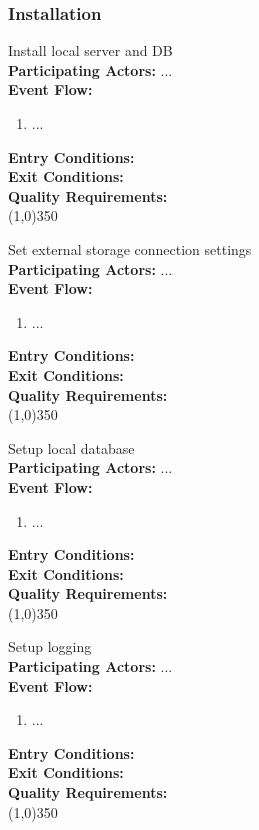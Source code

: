 \subsubsection{Installation}		 
		Install local server and DB\\	 
		\textbf{Participating Actors:}  ... \\
		\textbf{Event Flow:}
		\begin{enumerate}
\item  ...
	    \end{enumerate}
		\textbf{Entry Conditions:}\\
		\textbf{Exit Conditions:}\\
		\textbf{Quality Requirements:}\\
		\line(1,0){350}		
		
		Set external storage connection settings\\ 
		\textbf{Participating Actors:}  ... \\
		\textbf{Event Flow:}
		\begin{enumerate}
\item  ...
	    \end{enumerate}
		\textbf{Entry Conditions:}\\
		\textbf{Exit Conditions:}\\
		\textbf{Quality Requirements:}\\
		\line(1,0){350}		
		 
		Setup local database \\		 
		\textbf{Participating Actors:}  ... \\
		\textbf{Event Flow:}
		\begin{enumerate}
\item  ...
	    \end{enumerate}
		\textbf{Entry Conditions:}\\
		\textbf{Exit Conditions:}\\
		\textbf{Quality Requirements:}\\
		\line(1,0){350}
						 
		Setup logging \\		 
		\textbf{Participating Actors:}  ... \\
		\textbf{Event Flow:}
		\begin{enumerate}
\item  ...
	    \end{enumerate}
		\textbf{Entry Conditions:}\\
		\textbf{Exit Conditions:}\\
		\textbf{Quality Requirements:}\\
		\line(1,0){350}
						 
